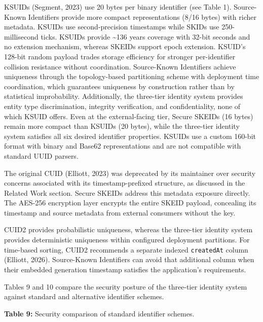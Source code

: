 \documentclass[fleqn,10pt]{wlpeerj}
\newcounter{none} %
\begin{document}
KSUIDs (Segment, 2023) use 20 bytes per binary identifier (see Table 1).
Source-Known Identifiers provide more compact representations (8/16
bytes) with richer metadata. KSUIDs use second-precision timestamps
while SKIDs use 250-millisecond ticks. KSUIDs provide \textasciitilde136
years coverage with 32-bit seconds and no extension mechanism, whereas
SKEIDs support epoch extension. KSUID's 128-bit random payload trades
storage efficiency for stronger per-identifier collision resistance
without coordination. Source-Known Identifiers achieve uniqueness
through the topology-based partitioning scheme with deployment time
coordination, which guarantees uniqueness by construction rather than by
statistical improbability. Additionally, the three-tier identity system
provides entity type discrimination, integrity verification, and
confidentiality, none of which KSUID offers. Even at the external-facing
tier, Secure SKEIDs (16 bytes) remain more compact than KSUIDs (20
bytes), while the three-tier identity system satisfies all six desired
identifier properties. KSUIDs use a custom 160-bit format with binary
and Base62 representations and are not compatible with standard UUID
parsers.

The original CUID (Elliott, 2023) was deprecated by its maintainer over
security concerns associated with its timestamp-prefixed structure, as
discussed in the Related Work section. Secure SKEIDs address this
metadata exposure directly. The AES-256 encryption layer encrypts the
entire SKEID payload, concealing its timestamp and source metadata from
external consumers without the key.

CUID2 provides probabilistic uniqueness, whereas the three-tier identity
system provides deterministic uniqueness within configured deployment
partitions. For time-based sorting, CUID2 recommends a separate indexed
\texttt{createdAt} column (Elliott, 2026). Source-Known Identifiers can
avoid that additional column when their embedded generation timestamp
satisfies the application's requirements.

Tables 9 and 10 compare the security posture of the three-tier identity
system against standard and alternative identifier schemes.

\textbf{Table 9:} Security comparison of standard identifier schemes.
\end{document}
